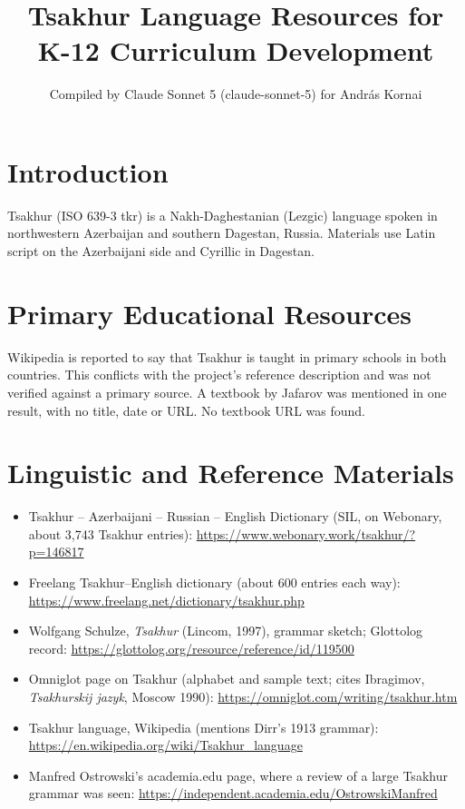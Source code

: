 \documentclass[12pt]{article}
\title{Tsakhur Language Resources for K-12 Curriculum Development}
\author{Compiled by Claude Sonnet 5 (claude-sonnet-5) for Andr\'as Kornai}
\date{}
\begin{document}
\maketitle

\section{Introduction}
Tsakhur (ISO 639-3 tkr) is a Nakh-Daghestanian (Lezgic) language spoken in northwestern Azerbaijan and southern Dagestan, Russia. Materials use Latin script on the Azerbaijani side and Cyrillic in Dagestan.

\section{Primary Educational Resources}
Wikipedia is reported to say that Tsakhur is taught in primary schools in both countries. This conflicts with the project's reference description and was not verified against a primary source. A textbook by Jafarov was mentioned in one result, with no title, date or URL. No textbook URL was found.

\section{Linguistic and Reference Materials}
\begin{itemize}
\item Tsakhur -- Azerbaijani -- Russian -- English Dictionary (SIL, on Webonary, about 3,743 Tsakhur entries): \url{https://www.webonary.work/tsakhur/?p=146817}
\item Freelang Tsakhur--English dictionary (about 600 entries each way): \url{https://www.freelang.net/dictionary/tsakhur.php}
\item Wolfgang Schulze, \emph{Tsakhur} (Lincom, 1997), grammar sketch; Glottolog record: \url{https://glottolog.org/resource/reference/id/119500}
\item Omniglot page on Tsakhur (alphabet and sample text; cites Ibragimov, \emph{Tsakhurskij jazyk}, Moscow 1990): \url{https://omniglot.com/writing/tsakhur.htm}
\item Tsakhur language, Wikipedia (mentions Dirr's 1913 grammar): \url{https://en.wikipedia.org/wiki/Tsakhur_language}
\item Manfred Ostrowski's academia.edu page, where a review of a large Tsakhur grammar was seen: \url{https://independent.academia.edu/OstrowskiManfred}
\end{itemize}
\end{document}
